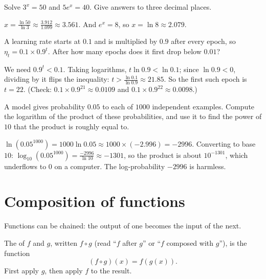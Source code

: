 \begin{exercise}
Solve $3^x = 50$ and $5e^{x} = 40$. Give answers to three decimal places.
\end{exercise}
\begin{solution}
$x = \tfrac{\ln 50}{\ln 3} \approx \tfrac{3.912}{1.099} \approx 3.561$. And
$e^x = 8$, so $x = \ln 8 \approx 2.079$.
\end{solution}

\begin{exercise}
A learning rate starts at $0.1$ and is multiplied by $0.9$ after every epoch,
so $\eta_t = 0.1 \times 0.9^t$. After how many epochs does it first drop below
$0.01$?
\end{exercise}
\begin{solution}
We need $0.9^t < 0.1$. Taking logarithms, $t\ln0.9 < \ln0.1$; since
$\ln 0.9 < 0$, dividing by it flips the inequality:
$t > \tfrac{\ln 0.1}{\ln 0.9} \approx 21.85$. So the first such epoch is
$t = 22$. (Check: $0.1\times0.9^{21} \approx 0.0109$ and
$0.1\times0.9^{22} \approx 0.0098$.)
\end{solution}

\begin{exercise}
A model gives probability $0.05$ to each of $1000$ independent examples. Compute
the logarithm of the product of these probabilities, and use it to find the
power of $10$ that the product is roughly equal to.
\end{exercise}
\begin{solution}
$\ln(0.05^{1000}) = 1000\ln0.05 \approx 1000 \times (-2.996) = -2996$.
Converting to base $10$: $\log_{10}(0.05^{1000}) = \tfrac{-2996}{\ln 10}
\approx -1301$, so the product is about $10^{-1301}$, which underflows to $0$
on a computer. The log-probability $-2996$ is harmless.
\end{solution}

\section{Composition of functions}\label{sec:composition}

Functions can be chained: the output of one becomes the input of the next.

\begin{definition}[Composition]\label{def:composition}
The  of $f$ and $g$, written $f \circ g$ (read ``$f$ after
$g$'' or ``$f$ composed with $g$''), is the function
\[
  (f \circ g)(x) = f(g(x)) .
\]
First apply $g$, then apply $f$ to the result.
\end{definition}


